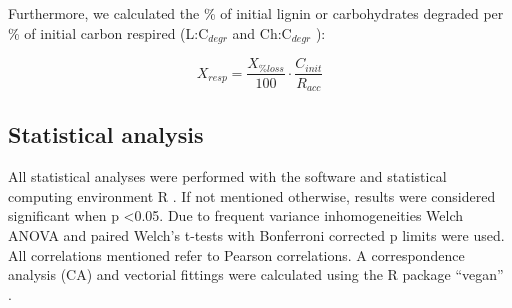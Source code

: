 Furthermore, we calculated the \% of initial lignin or carbohydrates degraded per \% of initial carbon respired (L:C$_{degr}$ and Ch:C$_{degr}$ ):

\begin{equation}
 X_{resp} = \frac{X_{\% loss}}{100} \cdot \frac{C_{init}}{R_{acc}}
 \label{eq:respcorr}
\end{equation}




\subsection*{Statistical analysis}
All statistical analyses were performed with the software and statistical computing environment R \cite{R}. If not mentioned otherwise, results were considered significant when p \textless 0.05. Due to frequent variance inhomogeneities Welch ANOVA and paired Welch's t-tests with Bonferroni corrected p limits were used. All correlations mentioned refer to Pearson correlations. A correspondence analysis (CA) and vectorial fittings were calculated using the R package ``vegan'' \cite{vegan}.
